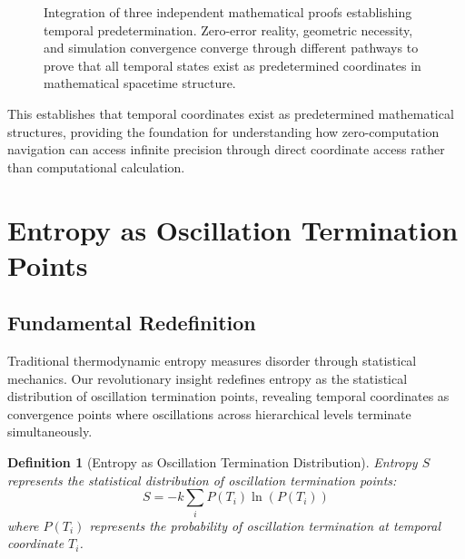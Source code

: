 \documentclass[12pt,a4paper]{article}
\newtheorem{definition}[theorem]{Definition}
\begin{document}
\begin{figure}[h]
\caption{Integration of three independent mathematical proofs establishing temporal predetermination. Zero-error reality, geometric necessity, and simulation convergence converge through different pathways to prove that all temporal states exist as predetermined coordinates in mathematical spacetime structure.}
\label{fig:three_pillars}
\end{figure}

This establishes that temporal coordinates exist as predetermined mathematical structures, providing the foundation for understanding how zero-computation navigation can access infinite precision through direct coordinate access rather than computational calculation.

\section{Entropy as Oscillation Termination Points}

\subsection{Fundamental Redefinition}

Traditional thermodynamic entropy measures disorder through statistical mechanics. Our revolutionary insight redefines entropy as the statistical distribution of oscillation termination points, revealing temporal coordinates as convergence points where oscillations across hierarchical levels terminate simultaneously.

\begin{definition}[Entropy as Oscillation Termination Distribution]
Entropy $S$ represents the statistical distribution of oscillation termination points:
$$S = -k \sum_i P(T_i) \ln(P(T_i))$$
where $P(T_i)$ represents the probability of oscillation termination at temporal coordinate $T_i$.
\end{definition}
\end{document}
